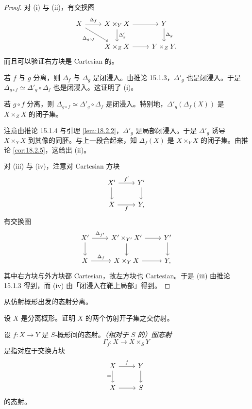 \begin{proof}
对 (i) 与 (ii)，有交换图
\[
\begin{tikzcd}
X \arrow[r,"\Delta_f"] \arrow[dr,"\Delta_{g\circ f}"'] & X\times_Y X \arrow[r] \arrow[d,"\Delta'_g"] & Y \arrow[d,"\Delta_g"] \\
& X\times_Z X \arrow[r] & Y\times_Z Y.
\end{tikzcd}
\]
而且可以验证右方块是 Cartesian 的。

若 $f$ 与 $g$ 分离，则 $\Delta_f$ 与 $\Delta_g$ 是闭浸入。由推论 15.1.3，$\Delta'_g$ 也是闭浸入。于是 $\Delta_{g\circ f}\simeq\Delta'_g\circ\Delta_f$ 也是闭浸入。这证明了 (i)。

若 $g\circ f$ 分离，则 $\Delta_{g\circ f}\simeq\Delta'_g\circ\Delta_f$ 是闭浸入。特别地，$\Delta'_g(\Delta_f(X))$ 是 $X\times_Z X$ 的闭子集。

注意由推论 15.1.4 与引理 \ref{lem:18.2.2}，$\Delta'_g$ 是局部闭浸入。于是 $\Delta'_g$ 诱导 $X\times_Y X$ 到其像的同胚。与上一段合起来，知 $\Delta_f(X)$ 是 $X\times_Y X$ 的闭子集。由推论 \ref{cor:18.2.5}，这给出 (ii)。

对 (iii) 与 (iv)，注意对 Cartesian 方块
\[
\begin{tikzcd}
X' \arrow[r,"f'"] \arrow[d] & Y' \arrow[d] \\
X \arrow[r,"f"'] & Y,
\end{tikzcd}
\]
有交换图
\[
\begin{tikzcd}
X' \arrow[r,"\Delta_{f'}"] \arrow[d] & X'\times_{Y'}X' \arrow[r] \arrow[d] & Y' \arrow[d] \\
X \arrow[r,"\Delta_f"] & X\times_Y X \arrow[r] & Y,
\end{tikzcd}
\]
其中右方块与外方块都 Cartesian，故左方块也 Cartesian。于是 (iii) 由推论 15.1.3 得到，而 (iv) 由「闭浸入在靶上局部」得到。
\end{proof}

\begin{exercise}\label{exc:18.2.8}
从仿射概形出发的态射分离。
\end{exercise}

\begin{exercise}\label{exc:18.2.9}
设 $X$ 是分离概形。证明 $X$ 的两个仿射开子集之交仿射。
\end{exercise}

\begin{definition}\label{def:18.2.10}
设 $f:X\to Y$ 是 $S$-概形间的态射。\emph{（相对于 $S$ 的）图态射}
\[
\Gamma_f:X\longrightarrow X\times_S Y
\]
是指对应于交换方块
\[
\begin{tikzcd}
X \arrow[r,"f"] \arrow[d,"="'] & Y \arrow[d] \\
X \arrow[r] & S
\end{tikzcd}
\]
的态射。
\end{definition}

